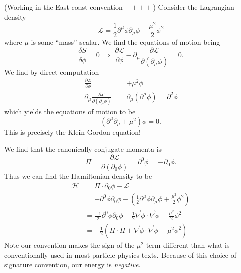 \begin{ex}\begin{footnotesize}
(Working in the East coast convention $-+++$) Consider the Lagrangian density
\begin{equation}%
\mathcal{L} = \frac{1}{2}\partial^{\mu}\phi\partial_{\mu}\phi + \frac{\mu^{2}}{2}\phi^{2}
\end{equation}
where $\mu$ is some ``mass'' scalar. We find the equations of
motion being
\begin{equation}%
\frac{\delta S}{\delta \phi}=0
\;\Rightarrow\;
\frac{\partial\mathcal{L}}{\partial\phi}
-\partial_{\mu}\frac{\partial\mathcal{L}}{\partial(\partial_{\mu}\phi)}
= 0.
\end{equation}
We find by direct computation
\begin{subequations}
\begin{align}
\frac{\partial\mathcal{L}}{\partial\phi} &= +\mu^{2}\phi\\
\partial_{\mu}\frac{\partial\mathcal{L}}{\partial(\partial_{\mu}\phi)}
&= \partial_{\mu}\left(\partial^{\mu}\phi\right)=\partial^{2}\phi 
\end{align}
\end{subequations}
which yields the equations of motion to be
\begin{equation}%
\left(\partial^{\mu}\partial_{\mu}+\mu^{2}\right)\phi = 0.
\end{equation}
This is precisely the Klein-Gordon equation!

We find that the canonically conjugate momenta is
\begin{equation}%
\Pi = \frac{\partial\mathcal{L}}{\partial(\partial_{0}\phi)} =
\partial^{0}\phi = -\partial_{0}\phi.
\end{equation}
Thus we can find the Hamiltonian density to be
\begin{subequations}
\begin{align}
\mathcal{H} &= \Pi\cdot\partial_{0}\phi-\mathcal{L}\\
&= -\partial^{0}\phi\partial_{0}\phi -
\left(\frac{1}{2}\partial^{\mu}\phi\partial_{\mu}\phi+\frac{\mu^{2}}{2}\phi^{2}\right) \\
&=\frac{-1}{2}\partial^{0}\phi\partial_{0}\phi-\frac{1}{2}\vec{\nabla}\phi\cdot\vec{\nabla}\phi-\frac{\mu^{2}}{2}\phi^{2}\\
&=-\frac{1}{2}\left(\Pi\cdot\Pi+\vec{\nabla}\phi\cdot\vec{\nabla}\phi+\mu^{2}\phi^{2}\right)
\end{align}
\end{subequations}
Note our convention makes the sign of the $\mu^{2}$ term
different than what is conventionally used in most particle
physics texts. Because of this choice of signature convention,
our energy is \emph{negative}.


\end{footnotesize}
\end{ex}

